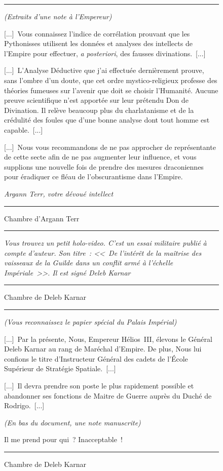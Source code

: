 \documentclass{article}
\newcommand{\newcharacter}{\clearpage\setcounter{figure}{0}}
\newcommand{\indice}[4]{
  \begin{figure}[H]
    \begin{center}
      \rule{0.5\textwidth}{1pt}
    \end{center}
    \begin{framed}
      \begin{samepage}
        \textit{#1}
        \nopagebreak

        #2

        \nopagebreak

        \hfill\textit{#3}
      \end{samepage}
    \end{framed}
    \caption{#4}
    \begin{center}
      \rule{0.5\textwidth}{1pt}
    \end{center}
  \end{figure}
}
\begin{document}
\indice
{(Extraits d'une note à l'Empereur)}
{[...]~Vous connaissez l'indice de corrélation prouvant que les Pythonisses
utilisent les données et analyses des intellects de l'Empire pour effectuer,
\textit{a posteriori}, des fausses divinations.~[...]

\nobreak

[...]~L'Analyse Déductive que j'ai effectuée dernièrement prouve, sans l'ombre
d'un doute, que cet ordre mystico-religieux professe des théories fumeuses sur
l'avenir que doit se choisir l'Humanité. Aucune preuve scientifique n'est
apportée sur leur prétendu Don de Divination. Il relève beaucoup plus du
charlatanisme et de la crédulité des foules que d'une bonne analyse dont tout
homme est capable.~[...]

\nobreak

[...]~Nous vous recommandons de ne pas approcher de représentante de cette
secte afin de ne pas augmenter leur influence, et vous supplions une nouvelle
fois de prendre des mesures draconiennes pour éradiquer ce fléau de
l'obscurantisme dans l'Empire.}
{Argann Terr, votre dévoué intellect}
{Chambre d'Argann Terr}

\newcharacter

\indice
{Vous trouvez un petit holo-video. C'est un essai militaire publié à compte
d'auteur. Son titre~: <<~De l'intérêt de la maîtrise des vaisseaux de la Guilde
dans un conflit armé à l'échelle Impériale~>>. Il est signé Deleb Karnar}
{}
{}
{Chambre de Deleb Karnar}

\indice
{(Vous reconnaissez le papier spécial du Palais Impérial)}
{[...]~Par la présente, Nous, Empereur Hélios~III, élevons le Général Deleb
Karnar au rang de Maréchal d'Empire. De plus, Nous lui confions le titre
d'Instructeur Général des cadets de l'École Supérieur de Stratégie
Spatiale.~[...]

\nobreak

[...]~Il devra prendre son poste le plus rapidement possible et abandonner ses
fonctions de Maitre de Guerre auprès du Duché de Rodrigo.~[...]

\nobreak

\textit{(En bas du document, une note manuscrite)}

\nobreak

Il me prend pour qui~? Inacceptable~!}
{}
{Chambre de Deleb Karnar}
\end{document}
